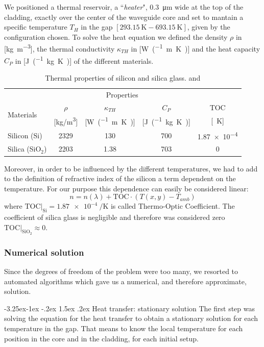 \documentclass[12pt,a4paper,twoside]{article}
\makeatletter
\renewcommand\paragraph{
   \@startsection{paragraph}{4}{\z@}%
   {-3.25ex\@plus -1ex \@minus -.2ex}%
   {1.5ex \@plus .2ex}%
   {\normalfont\normalsize\bfseries}}
\makeatother
\begin{document}
We positioned a thermal reservoir, a ``\textit{heater}", \SI{0.3}{\um} wide at the top of the cladding, exactly over the center of the waveguide core and set to mantain a specific temperature $T_H$ in the gap $[\SI{293.15}{\K} - \SI{693.15}{\K}]$, given by the configuration chosen.
To solve the heat equation we defined the density $\rho$ in [\si{\kg\per\m^3}], the thermal conductivity $\kappa_{TH}$ in [\si{\W\per(\m\K)}] and the heat capacity $C_P$ in [\si{\J\per(\kg\K)}] of the different materials.

\begin{table}[ht]
\centering
  \begin{tabular}{lcccc}  
    \toprule
		& \multicolumn{3}{c}{Properties} \\
    \cmidrule(r){2-5}
    	\multirow{2}{*}{Materials}    & $\rho$ & $\kappa_{TH}$ & $C_P$ & TOC\\
  		& [\si{\kg/\m^3}] & [\si{\W\per(\m\K)}] & [\si{\J\per(\kg\K)}] & [\si{\per\K}] \\
    \midrule
    Silicon (Si)			& 2329	& 130	& 700	& \num{1.87e-4}\\
    Silica (SiO$_2$)		& 2203	& 1.38	& 703	& 0\\
    \bottomrule
  \end{tabular}
  \label{tab_materials}
  \caption{Thermal properties of silicon and silica glass. \cite{toc} and \cite{n_db}}
\end{table}

Moreover, in order to be influenced by the different temperatures, we had to add to the definition of refractive index of the silicon a term dependent on the temperature.
For our purpose this dependence can easily be considered linear:
\begin{equation}
n = n(\lambda)+\mathrm{TOC}\cdot (T(x,y)-T_{amb})
\end{equation}
where $\mathrm{TOC}|_{\mathrm{Si}} = \SI{1.87e-4}{\per\K}$ is called Thermo-Optic Coefficient. The coefficient of silica glass is negligible and therefore was considered zero $\mathrm{TOC}|_{\mathrm{SiO}_2} \approx 0$.

\subsubsection{Numerical solution}
Since the degrees of freedom of the problem were too many, we resorted to automated algorithms which gave us a numerical, and therefore approximate, solution.

\paragraph{Heat transfer: stationary solution}
The first step was solving the equation for the heat transfer to obtain a stationary solution for each temperature in the gap.
That means to know the local temperature for each position in the core and in the cladding, for each initial setup.
\end{document}
